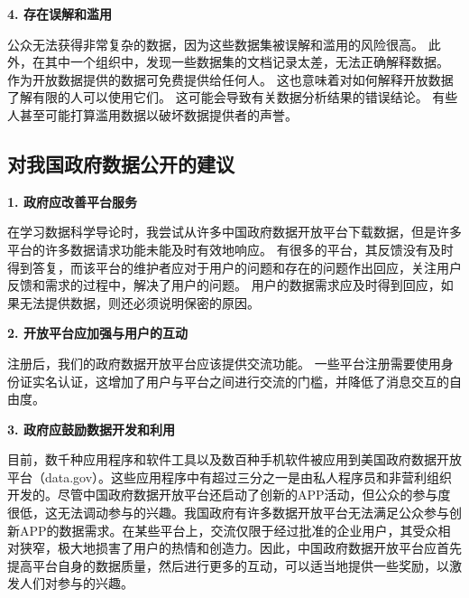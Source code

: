 \documentclass[a4paper, 11pt,twoside=true,UTF8]{scrartcl}
\begin{document}
\textbf{4. 存在误解和滥用}

公众无法获得非常复杂的数据，因为这些数据集被误解和滥用的风险很高。 此外，在其中一个组织中，发现一些数据集的文档记录太差，无法正确解释数据。 作为开放数据提供的数据可免费提供给任何人。 这也意味着对如何解释开放数据了解有限的人可以使用它们。 这可能会导致有关数据分析结果的错误结论。 有些人甚至可能打算滥用数据以破坏数据提供者的声誉。

\subsection{对我国政府数据公开的建议}
\qquad \textbf{1. 政府应改善平台服务}

在学习数据科学导论时，我尝试从许多中国政府数据开放平台下载数据，但是许多平台的许多数据请求功能未能及时有效地响应。 有很多的平台，其反馈没有及时得到答复，而该平台的维护者应对于用户的问题和存在的问题作出回应，关注用户反馈和需求的过程中，解决了用户的问题。 用户的数据需求应及时得到回应，如果无法提供数据，则还必须说明保密的原因。

\textbf{2. 开放平台应加强与用户的互动}

注册后，我们的政府数据开放平台应该提供交流功能。 一些平台注册需要使用身份证实名认证，这增加了用户与平台之间进行交流的门槛，并降低了消息交互的自由度。

\textbf{3. 政府应鼓励数据开发和利用}

目前，数千种应用程序和软件工具以及数百种手机软件被应用到美国政府数据开放平台（data.gov）。这些应用程序中有超过三分之一是由私人程序员和非营利组织开发的。尽管中国政府数据开放平台还启动了创新的APP活动，但公众的参与度很低，这无法调动参与的兴趣。我国政府有许多数据开放平台无法满足公众参与创新APP的数据需求。在某些平台上，交流仅限于经过批准的企业用户，其受众相对狭窄，极大地损害了用户的热情和创造力。因此，中国政府数据开放平台应首先提高平台自身的数据质量，然后进行更多的互动，可以适当地提供一些奖励，以激发人们对参与的兴趣。
\end{document}
